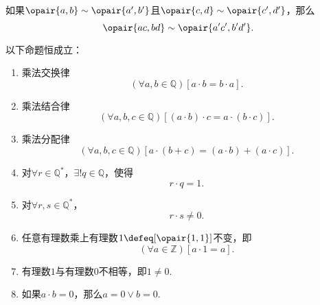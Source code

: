 \begin{lemma}\label{theorem:集合论.有理数集上的乘法运算是良定的}
如果\(\opair{a,b}\sim\opair{a',b'}\)且\(\opair{c,d}\sim\opair{c',d'}\)，那么\begin{equation*}
	\opair{ac,bd}\sim\opair{a'c',b'd'}.
\end{equation*}
\end{lemma}

\begin{theorem}\label{theorem:集合论.有理数乘法的运算法则}
以下命题恒成立：
\begin{enumerate}
	\item 乘法交换律
	\begin{equation}\label{equation:集合论.有理数乘法交换律}
		(\forall a,b\in\mathbb{Q})[a \cdot b = b \cdot a].
	\end{equation}
	\item 乘法结合律
	\begin{equation}\label{equation:集合论.有理数乘法结合律}
		(\forall a,b,c\in\mathbb{Q})[(a \cdot b) \cdot c = a \cdot (b \cdot c)].
	\end{equation}
	\item 乘法分配律
	\begin{equation}\label{equation:集合论.有理数乘法分配律}
		(\forall a,b,c\in\mathbb{Q})[a \cdot (b + c) = (a \cdot b) + (a \cdot c)].
	\end{equation}
	\item 对\(\forall r\in\mathbb{Q}^*\)，\(\exists! q\in\mathbb{Q}\)，使得\begin{equation*}
		r \cdot q = 1.
	\end{equation*}
	\item 对\(\forall r,s\in\mathbb{Q}^*\)，\begin{equation*}
		r \cdot s \neq 0.
	\end{equation*}
	\item 任意有理数乘上有理数\(1\defeq[\opair{1,1}]\)不变，即
	\begin{equation}\label{equation:集合论.任意有理数乘上一不变}
		(\forall a\in\mathbb{Z})[a \cdot 1 = a].
	\end{equation}
	\item 有理数\(1\)与有理数\(0\)不相等，即\(1\neq0\).
	\item 如果\(a \cdot b = 0\)，那么\(a = 0 \lor b = 0\).
\end{enumerate}
\end{theorem}

